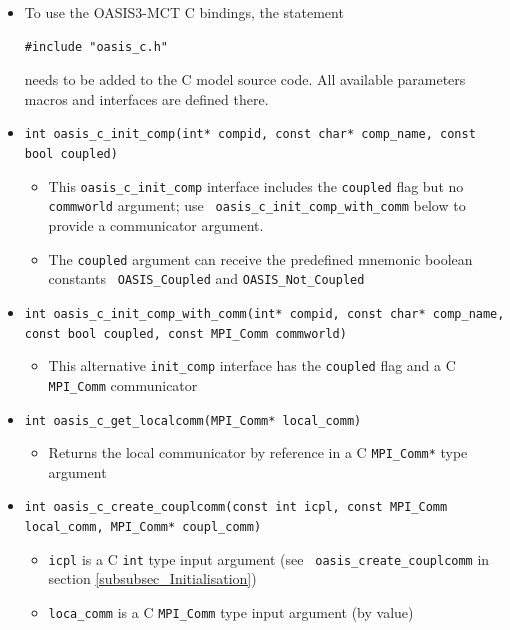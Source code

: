\vspace{0.2cm}
\begin{itemize}

\item To use the OASIS3-MCT C bindings, the statement
\begin{verbatim}
#include "oasis_c.h"
\end{verbatim}
needs to be added to the C model source code.  All available
parameters macros and
interfaces are defined there.

\item {\tt int oasis\_c\_init\_comp(int* compid, const char* comp\_name, const bool coupled)}
  \begin{itemize}
  \item This {\tt oasis\_c\_init\_comp} interface includes the {\tt coupled} flag but no {\tt commworld}
    argument; use  {\tt
      oasis\_c\_init\_comp\_with\_comm} below to provide a
    communicator argument.
    \item The {\tt coupled} argument can receive the predefined mnemonic boolean constants {\tt
      OASIS\_Coupled} and {\tt OASIS\_Not\_Coupled}
  \end{itemize}

\vspace{0.2cm}
\item {\tt int oasis\_c\_init\_comp\_with\_comm(int* compid, const char* comp\_name, const bool coupled, const MPI\_Comm commworld)}
  \begin{itemize}
  \item This alternative {\tt init\_comp} interface has the {\tt coupled} flag and a C {\tt MPI\_Comm} communicator
  \end{itemize}

\vspace{0.2cm}
\item {\tt int oasis\_c\_get\_localcomm(MPI\_Comm* local\_comm)}
  \begin{itemize}
  \item Returns the local communicator by reference in a C {\tt MPI\_Comm*} type argument
  \end{itemize}

\vspace{0.2cm}
\item {\tt int oasis\_c\_create\_couplcomm(const int icpl, const MPI\_Comm local\_comm, MPI\_Comm* coupl\_comm)}
  \begin{itemize}
  \item {\tt icpl} is a C {\tt int} type input argument (see {\tt
      oasis\_create\_couplcomm} in section \ref{subsubsec_Initialisation})
  \item {\tt loca\_comm} is a C {\tt MPI\_Comm} type input argument (by value)


\end{itemize}
\end{itemize}
